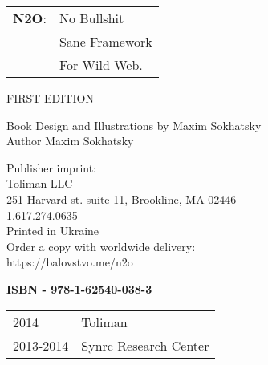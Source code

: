 \begingroup
\footnotesize
\parindent 0pt
\parskip 
\baselineskip
\begin{tabular}{ll}
{\bf N2O}: & No Bullshit \\
    & Sane Framework \\
    & For Wild Web. \\
\end{tabular}

FIRST EDITION

Book Design and Illustrations by Maxim Sokhatsky \\
Author Maxim Sokhatsky

Publisher imprint: \\
Toliman LLC \\
251 Harvard st. suite 11, Brookline, MA 02446 \\
1.617.274.0635 \\

Printed in Ukraine \\

Order a copy with worldwide delivery: \\
https://balovstvo.me/n2o

{\bf  ISBN - 978-1-62540-038-3\hspace{2em}}

\begin{tabular}{ll}
\textcopyright{} 2014 & Toliman \\
\textcopyright{} 2013-2014 & Synrc Research Center
\end{tabular}

\endgroup

   \thispagestyle{empty}
 